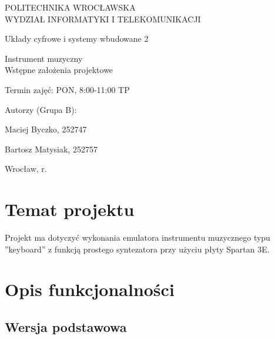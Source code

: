 \documentclass{article}
\begin{document}
\begin{titlepage}
    \begin{center}\LARGE POLITECHNIKA WROCŁAWSKA \\ WYDZIAŁ INFORMATYKI I TELEKOMUNIKACJI \end{center}
    \vspace{57pt}
    \begin{center} \Huge Układy cyfrowe i systemy wbudowane 2 \end{center}
    \vspace{35pt}
    \begin{center} \LARGE Instrument muzyczny \\ Wstępne założenia projektowe \end{center}
    \vspace{50pt}
    \begin{flushleft}\Large Termin zajęć: PON, 8:00-11:00 TP   \end{flushleft}
    \vspace{15pt}
    \begin{paracol}{2}
        \raggedright{\Large Autorzy (Grupa B):} \switchcolumn {} \switchcolumn
        \raggedright{\Large Maciej Byczko, 252747} \switchcolumn {} \switchcolumn
        \raggedright{\Large Bartosz Matysiak, 252757} 
    \end{paracol}
    \vspace{250pt}
    \begin{center}Wrocław, \the\year{}r.\end{center}
\end{titlepage}


\section{Temat projektu}

Projekt ma dotyczyć wykonania emulatora instrumentu muzycznego typu ''keyboard'' z funkcją prostego syntezatora przy użyciu płyty Spartan 3E.

\section{Opis funkcjonalności} %

\subsection{Wersja podstawowa}
\end{document}
